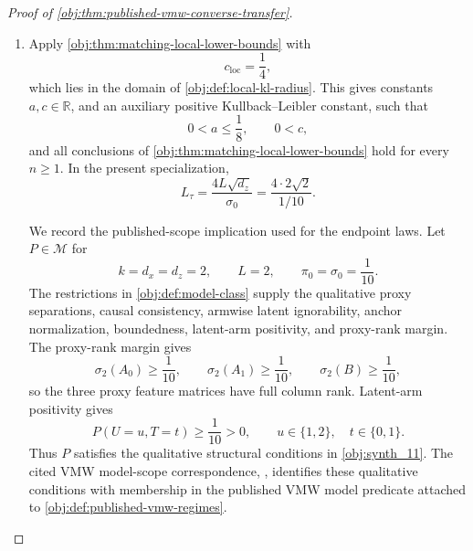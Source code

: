 \begin{proof}[Proof of \cref{obj:thm:published-vmw-converse-transfer}]
\begin{enumerate}
\item Apply \cref{obj:thm:matching-local-lower-bounds} with
\[
c_{\mathrm{loc}}=\frac14,
\]
which lies in the domain of \cref{obj:def:local-kl-radius}.  This gives constants \(a,c\in\mathbb R\), and an auxiliary positive Kullback--Leibler constant, such that
\[
0<a\le \frac18,
\qquad
0<c,
\]
and all conclusions of \cref{obj:thm:matching-local-lower-bounds} hold for every \(n\ge1\).  In the present specialization,
\[
L_\tau
=\frac{4L\sqrt{d_z}}{\sigma_0}
=\frac{4\cdot2\sqrt2}{1/10}.
\]

We record the published-scope implication used for the endpoint laws.  Let \(P\in\mathcal M\) for
\[
k=d_x=d_z=2,\qquad L=2,\qquad \pi_0=\sigma_0=\frac1{10}.
\]
The restrictions in \cref{obj:def:model-class} supply the qualitative proxy separations, causal consistency, armwise latent ignorability, anchor normalization, boundedness, latent-arm positivity, and proxy-rank margin.  The proxy-rank margin gives
\[
\sigma_2(A_0)\ge \frac1{10},
\qquad
\sigma_2(A_1)\ge \frac1{10},
\qquad
\sigma_2(B)\ge \frac1{10},
\]
so the three proxy feature matrices have full column rank.  Latent-arm positivity gives
\[
P(U=u,T=t)\ge \frac1{10}>0,
\qquad
u\in\{1,2\},\quad t\in\{0,1\}.
\]
Thus \(P\) satisfies the qualitative structural conditions in \cref{obj:synth_11}.  The cited VMW model-scope correspondence, \citep[Assumptions 1--2 and Section 4.2]{VirkMazaheriWu2026}, identifies these qualitative conditions with membership in the published VMW model predicate attached to \cref{obj:def:published-vmw-regimes}.


\end{enumerate}
\end{proof}
